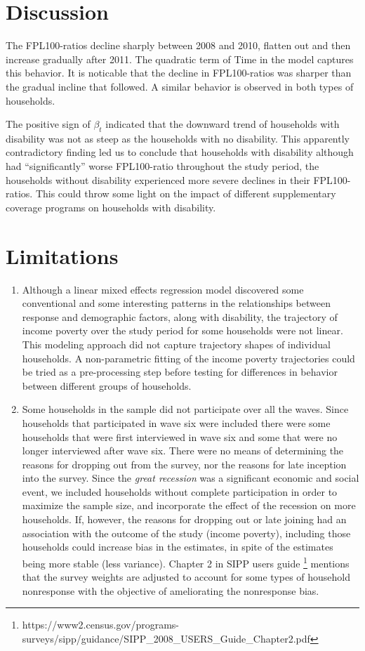 \documentclass[11pt]{extarticle} %
\begin{document}
\section*{Discussion}
The FPL100-ratios decline sharply between 2008 and 2010, flatten out and then increase gradually after 2011. The quadratic term of Time in the model captures this behavior. It is noticable that the decline in FPL100-ratios was sharper than the gradual incline that followed. A similar behavior is observed in both types of households. 

The positive sign of $\beta_t$ indicated that the downward trend of households with disability was not as steep as the households with no disability. This apparently contradictory finding led us to conclude that households with disability although had ``significantly'' worse FPL100-ratio throughout the study period, the households without disability experienced more severe declines in their FPL100-ratios. This could throw some light on the impact of different supplementary coverage programs on households with disability.

\section*{Limitations}
\begin{enumerate}
\item Although a linear mixed effects regression model discovered some conventional and some interesting patterns in the relationships between response and demographic factors, along with disability, the trajectory of income poverty over the study period for some households were not linear. This modeling approach did not capture trajectory shapes of individual households. A non-parametric fitting of the income poverty trajectories could be tried as a pre-processing step before testing for differences in behavior between different groups of households. 

\item Some households in the sample did not participate over all the waves. Since households that participated in wave six were included there were some households that were first interviewed in wave six and some that were no longer interviewed after wave six. There were no means of determining the reasons for dropping out from the survey, nor the reasons for late inception into the survey. Since the {\emph{great recession}} was a significant economic and social event, we included households without complete participation in order to maximize the sample size, and incorporate the effect of the recession on more households. If, however, the reasons for dropping out or late joining had an association with the outcome of the study (income poverty), including those households could increase bias in the estimates, in spite of the estimates being more stable (less variance). Chapter 2 in SIPP users guide \footnote{https://www2.census.gov/programs-surveys/sipp/guidance/SIPP\_2008\_USERS\_Guide\_Chapter2.pdf} mentions that the survey weights are adjusted to account for some types of household nonresponse with the objective of ameliorating the nonresponse bias. 
\end{enumerate}



\newpage




\newpage

\end{document}
